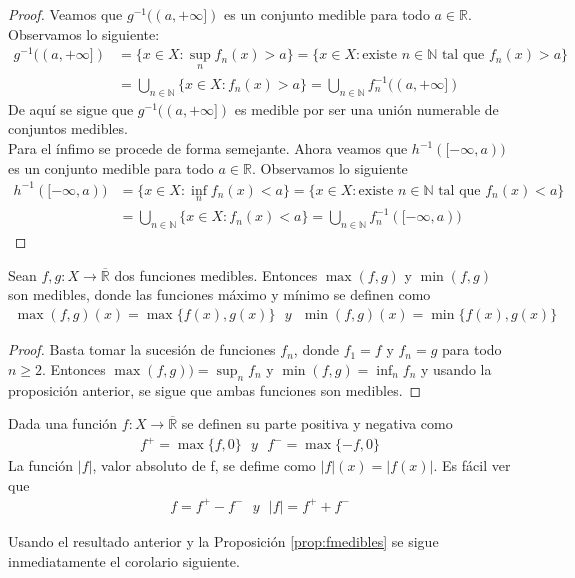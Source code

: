 \begin{proof}
Veamos que $g^{-1}((a,+\infty])$ es un conjunto medible para todo $a \in \mathbb{R}$. Observamos lo siguiente:
\begin{align*}
    g^{-1}((a,+\infty]) &= \{ x \in X : \sup_n{f_n(x)} > a\} = \{ x \in X : \text{existe } n \in \mathbb{N} \text{ tal que }f_n(x) > a\}\\
    &= \bigcup_{n \in \mathbb{N}}{\{ x \in X : f_n(x) > a \}} = \bigcup_{n \in \mathbb{N}}{f_n^{-1}((a,+\infty])}
\end{align*}
De aquí se sigue que $g^{-1}((a,+\infty])$ es medible por ser una unión numerable de conjuntos medibles.
\\
\newline
Para el ínfimo se procede de forma semejante. Ahora veamos que $h^{-1}([-\infty,a))$ es un conjunto medible para todo $a \in \mathbb{R}$. Observamos lo siguiente
\begin{align*}
    h^{-1}([-\infty,a)) &= \{ x \in X : \inf_n{f_n(x)} < a\} = \{ x \in X : \text{existe } n \in \mathbb{N} \text{ tal que }f_n(x) < a\}\\
    &= \bigcup_{n \in \mathbb{N}}{\{ x \in X : f_n(x) < a \}} = \bigcup_{n \in \mathbb{N}}{f_n^{-1}([-\infty,a))}
\end{align*}
\end{proof}

\begin{cor}
Sean $f,g: X \longrightarrow \overline{\mathbb{R}}$ dos funciones medibles. Entonces $\max(f,g)$ y $\min(f,g)$ son medibles, donde las funciones máximo y mínimo se definen como
\begin{align*}
    \max(f,g)(x) = \max\{ f(x), g(x)\} \ \ \ y \ \ \ \min(f,g)(x) = \min\{ f(x), g(x)\}
\end{align*}
\end{cor}

\begin{proof}
Basta tomar la sucesión de funciones $f_n$, donde $f_1 = f$ y $f_n = g$ para todo $n \ge 2$. Entonces $\max(f,g) ) = \sup_n{f_n}$ y $\min(f,g) = \inf_n{f_n}$ y usando la proposición anterior, se sigue que ambas funciones son medibles.
\end{proof}

\begin{defi}
 Dada una función $f: X \longrightarrow \overline{\mathbb{R}}$ se definen su parte positiva y negativa como
 \begin{align*}
     f^+ = \max\{ f, 0\} \ \ \ y \ \ \ f^- = \max\{ -f, 0\}
 \end{align*}
 La función $|f|$, valor absoluto de f, se defime como $|f|(x) = |f(x)|$. Es fácil ver que
 \begin{align*}
     f = f^+ - f^- \ \ \ y \ \ \ |f| = f^+ + f^-
\end{align*}
\end{defi}
 Usando el resultado anterior y la Proposición \ref{prop:fmedibles} se sigue inmediatamente el corolario siguiente.
 
